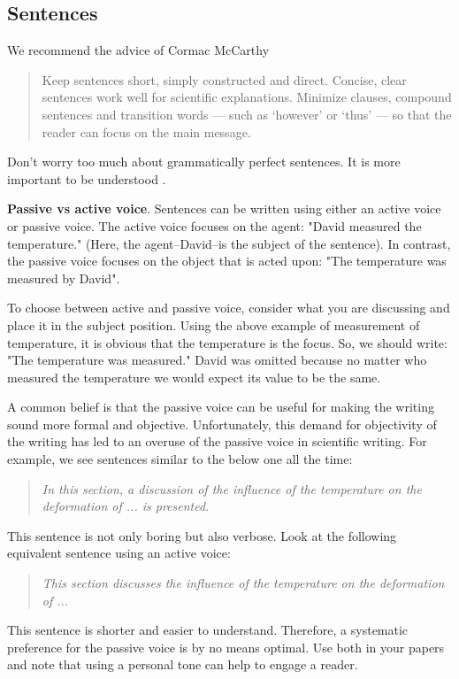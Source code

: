 \documentclass[authoryear,12pta4paper,fleqn]{article}
\numberwithin{equation}{section}
\theoremstyle{remark}
\begin{document}
\subsection{Sentences}\label{sec:sentences}

We recommend the advice of Cormac McCarthy \citep{McCarthy}

\begin{quote}
Keep sentences short, simply constructed and direct. Concise, clear sentences work well for scientific explanations. Minimize clauses, compound sentences and transition words — such as ‘however’ or ‘thus’ — so that the reader can focus on the main message.
\end{quote}
Don't worry too much about grammatically perfect sentences. It is more important to be understood \citep{McCarthy}. 


\noindent\textbf{Passive vs active voice}.     Sentences can be written using either an active voice  or passive voice. The active voice focuses on the agent: "David measured the temperature." (Here, the agent--David--is the subject of the sentence). In contrast, the passive voice focuses on the object that is acted upon: "The temperature was measured by David". 

To choose between active and passive voice, consider what you are discussing and place it in the subject position. Using the above example of measurement of temperature, it is obvious that the temperature is the focus. So, we should write: "The temperature was measured." David was omitted because no matter who measured the temperature we would expect its value to be the same. 

 A common belief is that the passive voice can be useful for making the writing sound more formal and objective. 
Unfortunately, this demand for objectivity of the writing has led to an overuse of the passive voice in scientific writing. For example, we see  sentences similar to the below one all the time:

\begin{quote}
\textit{In this section, a discussion of the influence of the temperature on the deformation of ... is presented.}
\end{quote}
This sentence is not only boring but also verbose. Look at the following equivalent sentence using an active voice:

\begin{quote}
\textit{This section discusses the influence of the temperature on the deformation of ...}
\end{quote}
This sentence is shorter and easier to understand. Therefore, a systematic preference for the passive voice is by no means optimal. Use both in your papers and note that using a personal tone can help to engage a reader. 
\end{document}
